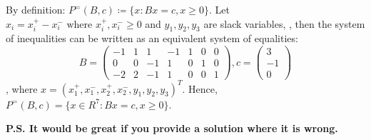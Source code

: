 \documentclass{homework}
\begin{document}
\begin{enumerate}[label=(\alph*)]
	By definition: $P^=(B,c)\coloneqq\{x:Bx=c,x\geq0\}$. Let $x_i = x_i^+ - x_i^-\text{ where }x_i^+, x_i^- \geq0$ and $y_1, y_2, y_3$ are slack variables, , then the system of inequalities can be written as an equivalent system of equalities:
	\[ B =
	\begin{pmatrix}
	-1 & 1 & 1 & -1 & 1 &0 &0\\
	0 & 0 &-1 & 1 & 0 &1 &0 \\
	-2 & 2 & -1 & 1 &0 &0 &1
	\end{pmatrix}
	, c =
	\begin{pmatrix}
	3\\
	-1\\
	0
	\end{pmatrix}
	\], where $x = (x_1^+ , x_1^-, x_2^+ , x_2^-, y_1, y_2, y_3)^T$. Hence, $P^=(B,c)=\{x\in R^7: Bx=c, x\geq0\}$.
\end{enumerate}
\textbf{P.S. It would be great if you provide a solution where it is wrong.}
\end{document}
